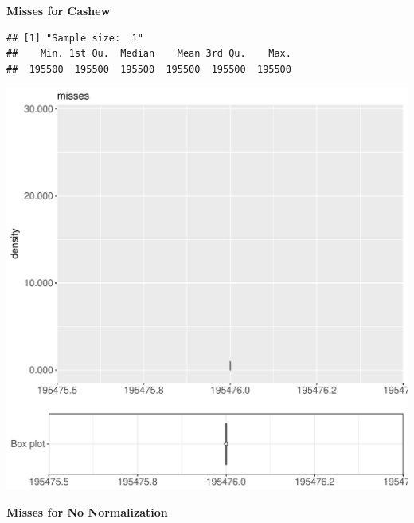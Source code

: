 \documentclass{article}\usepackage[]{graphicx}\usepackage[]{color}
\makeatletter
\def\maxwidth{ %
  \ifdim\Gin@nat@width>\linewidth
    \linewidth
  \else
    \Gin@nat@width
  \fi
}
\newenvironment{kframe}{%
 \def\at@end@of@kframe{}%
 \ifinner\ifhmode%
  \def\at@end@of@kframe{\end{minipage}}%
  \begin{minipage}{\columnwidth}%
 \fi\fi%
 \def\FrameCommand##1{\hskip\@totalleftmargin \hskip-\fboxsep
 \colorbox{shadecolor}{##1}\hskip-\fboxsep
     \hskip-\linewidth \hskip-\@totalleftmargin \hskip\columnwidth}%
 \MakeFramed {\advance\hsize-\width
   \@totalleftmargin\z@ \linewidth\hsize
   \@setminipage}}%
 {\par\unskip\endMakeFramed%
 \at@end@of@kframe}
\newenvironment{knitrout}{}{} %
\makeatother
\begin{document}
 \textbf{Misses for Cashew}
\begin{knitrout}
\color{fgcolor}\begin{kframe}
\begin{verbatim}
## [1] "Sample size:  1"
##    Min. 1st Qu.  Median    Mean 3rd Qu.    Max. 
##  195500  195500  195500  195500  195500  195500
\end{verbatim}


{\ttfamily\noindent\bfseries{}}\end{kframe}
\includegraphics[width=\maxwidth]{figure/RH4_cashew_password2-1} 

\end{knitrout}
 \textbf{Misses for No Normalization}
\end{document}
